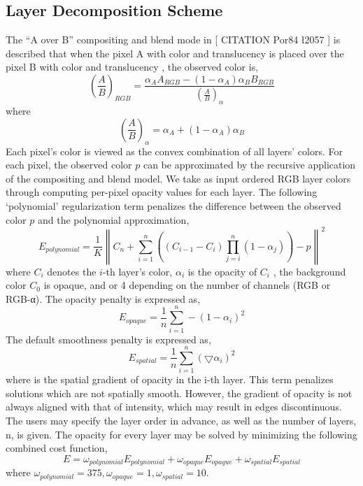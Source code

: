 \subsection{Layer Decomposition Scheme}
The “A over B” compositing and blend mode in [ CITATION Por84 \l 2057 ] is described that when the pixel A with color  and translucency  is placed over the pixel B with color  and translucency , the observed color is,
\begin{equation} \label{eq:aoverb}
\left ( \frac{A}{B} \right )_{RGB}=\frac{\alpha_{A}A_{RGB}-(1-\alpha_{A})\alpha_{B}B_{RGB}}{\left ( \frac{A}{B} \right )_{\alpha}} 
\end{equation} 
where 
\[\left ( \frac{A}{B} \right )_{\alpha} = \alpha_{A}+(1-\alpha_{A})\alpha_{B} \]
Each pixel’s color is viewed as the convex combination of all layers’ colors. For each pixel, the observed color $p$ can be approximated by the recursive application of the compositing and blend model. We take as input ordered RGB layer colors through computing per-pixel opacity values for each layer. The following ‘polynomial’ regularization term penalizes the difference between the observed color $p$ and the polynomial approximation,
\[E_{polynomial}=\frac{1}{K}\left \|    C_{n}+\sum_{i=1}^{n}  \left ( \left ( C_{i-1}-C_{i} \right ) \prod_{j=i}^{n}(1-\alpha_{j}) \right )-p  \right \|^{2}\]
where $ C_{i} $ denotes the $i$-th layer’s color, $ \alpha_{i} $ is the opacity of $ C_{i} $ , the background color  $ C_{0} $  is opaque, and  or 4 depending on the number of channels (RGB or RGB-α). The opacity penalty is expressed as,
\[E_{opaque}=\frac{1}{n}\sum_{i=1}^n-(1-\alpha_{i})^2\]
The default smoothness penalty is expressed as,
\[E_{spatial}=\frac{1}{n}\sum_{i=1}^n( \bigtriangledown  \alpha_{i})^2\]
where  is the spatial gradient of opacity in the i-th layer. This term penalizes solutions which are not spatially smooth. However, the gradient of opacity is not always aligned with that of intensity, which may result in edges discontinuous.\\
The users may specify the layer order in advance, as well as the number of layers, n, is given. The opacity for every layer may be solved by minimizing the following combined cost function,
\begin{equation}
E=\omega_{polynomial}E_{polynomial}+\omega_{opaque}E_{opaque}+\omega_{spatial}E_{spatial}
\label{eq:layer1}
\end{equation} 
where $\omega_{polynomial} = 375 ,\omega_{opaque}=1 , \omega_{spatial}=10$.
